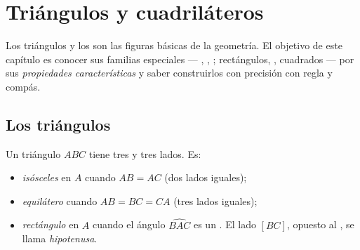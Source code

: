 \chapter{Triángulos y cuadriláteros}\label{ch:g6:shapes}

Los triángulos y los  son las figuras básicas de la geometría. El objetivo
de este capítulo es conocer sus familias especiales --- ,
, ; rectángulos, , cuadrados --- por
sus \emph{propiedades características} y saber construirlos con precisión con
regla y compás.

\section{Los triángulos}

\begin{definition}\label{def:g6:shapes:triangles}
Un triángulo $ABC$ tiene tres  y tres lados. Es:
\begin{itemize}
  \item \emph{isósceles} en $A$ cuando
        $AB = AC$ (dos lados iguales);
  \item \emph{equilátero} cuando
        $AB = BC = CA$ (tres lados iguales);
  \item \emph{rectángulo} en $A$ cuando el ángulo
        $\widehat{BAC}$ es un . El lado $[BC]$, opuesto al
        , se llama \emph{hipotenusa}.
\end{itemize}
\end{definition}

